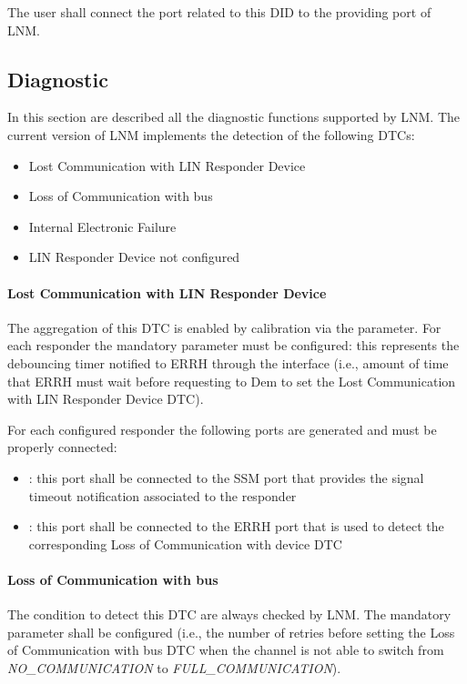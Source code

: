 The user shall connect the  port related to this DID to the providing \newline port  of LNM.

\subsection{Diagnostic}
\label{LNM Diagnostic}
In this section are described all the diagnostic functions supported by LNM. The current version of LNM implements the detection of the following DTCs:

\begin{itemize}
\item Lost Communication with LIN Responder Device
\item Loss of Communication with bus
\item Internal Electronic Failure
\item LIN Responder Device not configured
\end{itemize}


\paragraph{Lost Communication with LIN Responder Device}
The aggregation of this DTC is enabled by calibration via the  parameter. For each responder the mandatory parameter  must be configured: this represents the debouncing timer notified to ERRH through the  interface (i.e., amount of time that ERRH must wait before requesting to Dem to set the Lost Communication with LIN Responder Device DTC).



For each configured responder the following ports are generated and must be properly connected:

\begin{itemize}
\item {}: this port shall be connected to the SSM port that provides the signal timeout notification associated to the responder
\item {}: this port shall be connected to the ERRH port that is used to detect the corresponding Loss of Communication with device DTC
\end{itemize}


\paragraph{Loss of Communication with bus}
The condition to detect this DTC are always checked by LNM.
The mandatory parameter \newline {} shall be configured (i.e., the number of retries before setting the Loss of Communication with bus DTC when the channel is not able to switch from \textit{NO\_COMMUNICATION} to \textit{FULL\_COMMUNICATION}).


